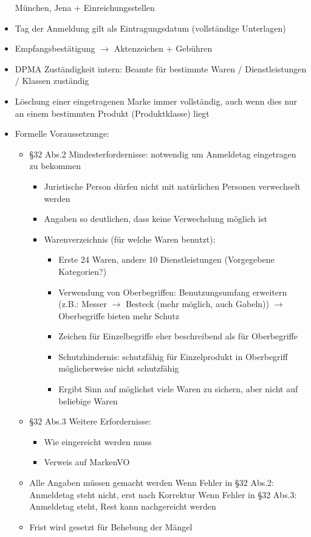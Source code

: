 \documentclass{report}
\begin{document}
\begin{itemize}
	\newline München, Jena + Einreichungsstellen
	\item Tag der Anmeldung gilt als Eintragungsdatum (vollständige Unterlagen)
	\item Empfangsbestätigung $\rightarrow$ Aktenzeichen + Gebühren
	\item DPMA Zuständigkeit intern: Beamte für bestimmte Waren / Dienstleistungen / Klassen zuständig
	\item Löschung einer eingetragenen Marke immer vollständig, auch wenn dies nur an einem bestimmten Produkt (Produktklasse) liegt
	\item Formelle Voraussetzunge:
	\begin{itemize}
		\item §32 Abs.2 Mindesterfordernisse:
		\newline notwendig um Anmeldetag eingetragen zu bekommen
		\begin{itemize}
			\item Juristische Person dürfen nicht mit natürlichen Personen verwechselt werden
			\item Angaben so deutlichen, dass keine Verwechslung möglich ist
			\item Warenverzeichnis (für welche Waren benutzt):
			\begin{itemize}
				\item Erste 24 Waren, andere 10 Dienstleistungen (Vorgegebene Kategorien?)
				\item Verwendung von Oberbegriffen:
				\newline Benutzungsumfang erweitern (z.B.: Messer $\rightarrow$ Besteck (mehr möglich, auch Gabeln))
				\newline $\rightarrow$ Oberbegriffe bieten mehr Schutz
				\item Zeichen für Einzelbegriffe eher beschreibend als für Oberbegriffe
				\item Schutzhindernis: schutzfähig für Einzelprodukt in Oberbegriff möglicherweise nicht schutzfähig
				\item Ergibt Sinn auf möglichst viele Waren zu sichern, aber nicht auf beliebige Waren
			\end{itemize}
		\end{itemize}
		\item §32 Abs.3 Weitere Erfordernisse:
		\begin{itemize}
			\item Wie eingereicht werden muss
			\item Verweis auf MarkenVO
		\end{itemize}
		\item Alle Angaben müssen gemacht werden
		\newline Wenn Fehler in §32 Abs.2: Anmeldetag steht nicht, erst nach Korrektur
		\newline Wenn Fehler in §32 Abs.3: Anmeldetag steht, Rest kann nachgereicht werden
		\item Frist wird gesetzt für Behebung der Mängel
	\end{itemize}
\end{itemize}
\end{document}
